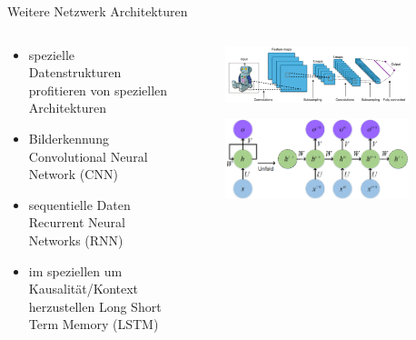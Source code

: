 \documentclass[aspectratio=1610, xcolor=dvipsnames, 9pt]{beamer}
\begin{document}
      
      \begin{frame}{Weitere Netzwerk Architekturen}
        \begin{columns}
          \begin{column}{0.6\textwidth}
            \begin{itemize}
              \item spezielle Datenstrukturen profitieren von speziellen Architekturen \newline 
              \item Bilderkennung \rightarrow Convolutional Neural Network (CNN) \newline 
              \item sequentielle Daten \rightarrow Recurrent Neural Networks (RNN) \newline 
              \item im speziellen um Kausalität/Kontext herzustellen \rightarrow Long Short Term Memory (LSTM) \newline
            \end{itemize}
          \end{column}
           \begin{column}{0.4\textwidth}
             \begin{figure}
               \centering
                           \includegraphics[width=0.9\textwidth]{images/CNN.png}
               \end{figure}
               \begin{figure}
                \centering
                            \includegraphics[width=0.9\textwidth]{images/RNN.png}
                \end{figure}
           \end{column}
        \end{columns}
      \end{frame}
\end{document}
